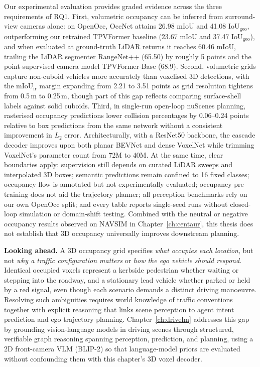 Our experimental evaluation provides graded evidence across the three requirements of RQ1. First, volumetric occupancy can be inferred from surround-view cameras alone: on OpenOcc, OccNet attains 26.98 mIoU and 41.08 $\text{IoU}_{\text{geo}}$, outperforming our retrained TPVFormer baseline (23.67 mIoU and 37.47 $\text{IoU}_{\text{geo}}$), and when evaluated at ground-truth LiDAR returns it reaches 60.46 mIoU, trailing the LiDAR segmenter RangeNet++ (65.50) by roughly 5 points and the point-supervised camera model TPVFormer-Base (68.9). Second, volumetric grids capture non-cuboid vehicles more accurately than voxelised 3D detections, with the $\text{mIoU}_{\text{ir}}$ margin expanding from 2.21 to 3.51 points as grid resolution tightens from 0.5\,m to 0.25\,m, though part of this gap reflects comparing surface-shell labels against solid cuboids. Third, in single-run open-loop nuScenes planning, rasterised occupancy predictions lower collision percentages by 0.06--0.24 points relative to box predictions from the same network without a consistent improvement in $L_2$ error. Architecturally, with a ResNet50 backbone, the cascade decoder improves upon both planar BEVNet and dense VoxelNet while trimming VoxelNet's parameter count from 72M to 40M. At the same time, clear boundaries apply: supervision still depends on curated LiDAR sweeps and interpolated 3D boxes; semantic predictions remain confined to 16 fixed classes; occupancy flow is annotated but not experimentally evaluated; occupancy pre-training does not aid the trajectory planner; all perception benchmarks rely on our own OpenOcc split; and every table reports single-seed runs without closed-loop simulation or domain-shift testing. Combined with the neutral or negative occupancy results observed on NAVSIM in Chapter~\ref{ch:centaur}, this thesis does not establish that 3D occupancy universally improves downstream planning.

\textbf{Looking ahead.} A 3D occupancy grid specifies \emph{what occupies each location}, but not \emph{why a traffic configuration matters} or \emph{how the ego vehicle should respond}. Identical occupied voxels represent a kerbside pedestrian whether waiting or stepping into the roadway, and a stationary lead vehicle whether parked or held by a red signal, even though each scenario demands a distinct driving manoeuvre. Resolving such ambiguities requires world knowledge of traffic conventions together with explicit reasoning that links scene perception to agent intent prediction and ego trajectory planning. Chapter~\ref{ch:drivelm} addresses this gap by grounding vision-language models in driving scenes through structured, verifiable graph reasoning spanning perception, prediction, and planning, using a 2D front-camera VLM (BLIP-2) so that language-model priors are evaluated without confounding them with this chapter's 3D voxel decoder.
